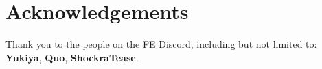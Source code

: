 \documentclass[a4paper]{report}
\begin{document}
\newcommand{\units}[1]{\item Select Units: \begin{itemize} #1 \end{itemize}}
\newcommand{\remove}[1]{\item Remove #1}
\newcommand{\add}[1]{\item Add #1}
\newcommand{\safetysave}{\item This is a good time to Safety \textbf{Save}}

\newcommand{\prep}[1]{\newline\newline Preparations: \begin{itemize} #1 \end{itemize}}
\newcommand{\inventory}[1]{\item Inventory: \begin{itemize} #1 \end{itemize}}

\newcommand{\support}[3]{\item Support #1 to #2, Rank #3}

\newcommand{\robinf}{\item \robin:}
\newcommand{\chromf}{\item \chrom:}
\newcommand{\frederickf}{\item \frederick:}
\newcommand{\lucinaf}{\item \lucina:}
\newcommand{\sullyf}{\item \sully:}
\newcommand{\rickenf}{\item \ricken:}
\newcommand{\cordeliaf}{\item \cordelia:}
\newcommand{\nowif}{\item \nowi:}
\newcommand{\oliviaf}{\item \olivia:}
\newcommand{\cherchef}{\item \cherche:}
\newcommand{\sayrif}{\item \sayri:}
\newcommand{\basiliof}{\item \basilio:}
\newcommand{\flaviaf}{\item \flavia:}


\setlength{\columnsep}{.5cm}

\section*{Acknowledgements}

Thank you to the people on the FE Discord, including but not limited to: \textbf{Yukiya}, \textbf{Quo}, \textbf{ShockraTease}.
\end{document}
